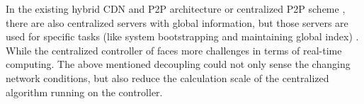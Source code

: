 In the existing hybrid CDN and P2P architecture \cite{yin2009design} or centralized P2P scheme \cite{lee2003centralized}, there are also centralized servers with global information, but those servers are used for specific tasks (like system bootstrapping and maintaining global index) \cite{androutsellis2004survey}. While the centralized controller of \name faces more challenges in terms of real-time computing. The above mentioned decoupling could not only sense the changing network conditions, but also reduce the calculation scale of the centralized algorithm running on the controller.
%
%

